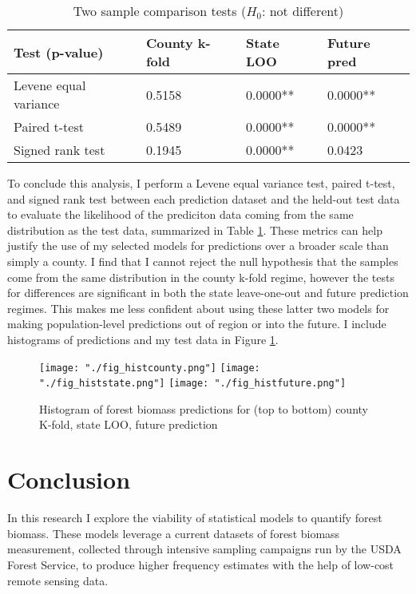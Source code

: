 \documentclass{article}
\begin{document}
\begin{table}[!htbp]
  \small
  \begin{center}
    \begin{tabular}{llll}
    \textbf{Test (p-value)} & \textbf{County k-fold} & \textbf{State LOO} & \textbf{Future pred}\\
    \bottomrule
    Levene equal variance & 0.5158 & 0.0000** & 0.0000**\\
    Paired t-test & 0.5489 & 0.0000** & 0.0000**\\
    Signed rank test & 0.1945 & 0.0000** & 0.0423\\
    \bottomrule
    \end{tabular}
    \end{center}
    \caption{\label{tab:twosample} Two sample comparison tests ($H_0$: not different)}
\end{table}

To conclude this analysis, I perform a Levene equal variance test, paired t-test, and signed rank test between each prediction dataset and the held-out test data to evaluate the likelihood of the prediciton data coming from the same distribution as the test data, summarized in Table \ref{tab:twosample}. These metrics can help justify the use of my selected models for predictions over a broader scale than simply a county. I find that I cannot reject the null hypothesis that the samples come from the same distribution in the county k-fold regime, however the tests for differences are significant in both the state leave-one-out and future prediction regimes. This makes me less confident about using these latter two models for making population-level predictions out of region or into the future. I include histograms of predictions and my test data in Figure \ref{fig:testhist}.

\begin{figure}[!htbp]
  \centering
  \texttt{[image: "./fig\_histcounty.png"]}
  \texttt{[image: "./fig\_histstate.png"]}
  \texttt{[image: "./fig\_histfuture.png"]}
  \caption{\label{fig:testhist} Histogram of forest biomass predictions for (top to bottom) county K-fold, state LOO, future prediction}
\end{figure}

\section{Conclusion}
In this research I explore the viability of statistical models to quantify forest biomass. These models leverage a current datasets of forest biomass measurement, collected through intensive sampling campaigns run by the USDA Forest Service, to produce higher frequency estimates with the help of low-cost remote sensing data. 
\end{document}
